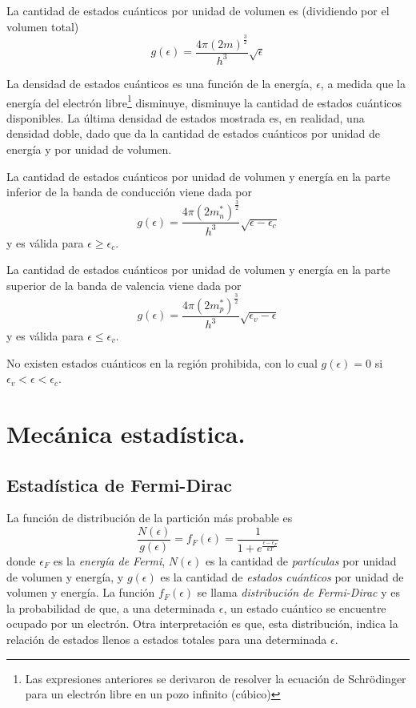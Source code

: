 \documentclass[12pt,a4paper]{article}
\begin{document}
La cantidad de estados cuánticos por unidad de volumen es (dividiendo por el volumen total)
\[ g(\epsilon) = \frac{4 \pi (2m)^{\frac{3}{2}}}{h^{3}} \sqrt{\epsilon} \]

La densidad de estados cuánticos es una función de la energía, $\epsilon$, a medida que la energía del electrón libre\footnote{Las expresiones anteriores se derivaron de resolver la ecuación de Schrödinger para un electrón libre en un pozo infinito (cúbico)} disminuye, disminuye la cantidad de estados cuánticos disponibles. La última densidad de estados mostrada es, en realidad, una densidad doble, dado que da la cantidad de estados cuánticos por unidad de energía y por unidad de volumen.

La cantidad de estados cuánticos por unidad de volumen y energía en la parte inferior de la banda de conducción viene dada por
\[ g(\epsilon) = \frac{4 \pi (2m_{n}^{\ast})^{\frac{3}{2}}}{h^{3}} \sqrt{\epsilon - \epsilon _{c}} \]
y es válida para $\epsilon \geq \epsilon _{c}$.

La cantidad de estados cuánticos por unidad de volumen y energía en la parte superior de la banda de valencia viene dada por
\[ g(\epsilon) = \frac{4 \pi (2m_{p}^{\ast})^{\frac{3}{2}}}{h^{3}} \sqrt{\epsilon _{v} - \epsilon} \]
y es válida para $\epsilon \leq \epsilon _{v}$.

No existen estados cuánticos en la región prohibida, con lo cual $g(\epsilon)=0$ si $\epsilon _{v} < \epsilon < \epsilon _{c}$.

\section{Mecánica estadística.}

\subsection{Estadística de Fermi-Dirac}

La función de distribución de la partición más probable es
\[ \frac{N(\epsilon)}{g(\epsilon)}=f_{F}(\epsilon)=\frac{1}{1+e^{\frac{\epsilon-\epsilon _{F}}{kT}}} \]
donde $\epsilon _{F}$ es la \emph{energía de Fermi}, $N(\epsilon)$ es la cantidad de \emph{partículas} por unidad de volumen y energía, y $g(\epsilon)$ es la cantidad de \emph{estados cuánticos} por unidad de volumen y energía. La función $f_{F}(\epsilon)$ se llama \emph{distribución de Fermi-Dirac} y es la probabilidad de que, a una determinada $\epsilon$, un estado cuántico se encuentre ocupado por un electrón. Otra interpretación es que, esta distribución, indica la relación de estados llenos a estados totales para una determinada $\epsilon$.
\end{document}
